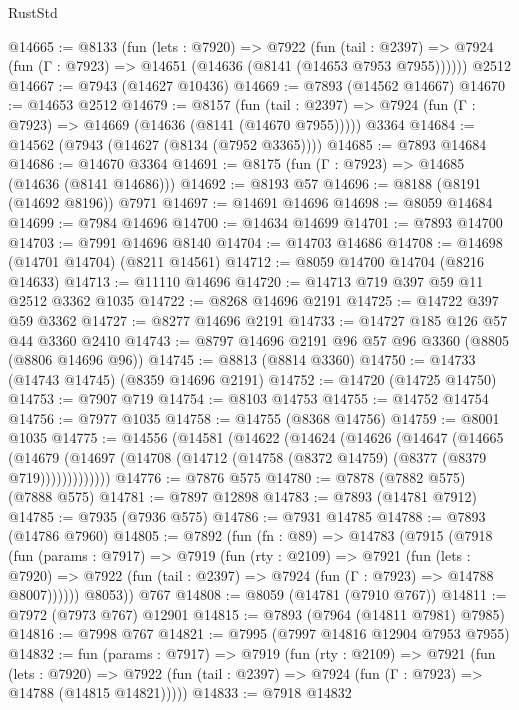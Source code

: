\begin{lexlean}{RustStd}
\begin{coremodule}
@14665 := @8133
    (fun (lets : @7920) =>
    @7922
      (fun (tail : @2397) =>
      @7924 (fun (Γ : @7923) => @14651 (@14636 (@8141 (@14653 @7953 @7955))))))
    @2512
@14667 := @7943 (@14627 @10436)
@14669 := @7893 (@14562 @14667)
@14670 := @14653 @2512
@14679 := @8157
    (fun (tail : @2397) => @7924 (fun (Γ : @7923) => @14669 (@14636 (@8141 (@14670 @7955)))))
    @3364
@14684 := @14562 (@7943 (@14627 (@8134 (@7952 @3365))))
@14685 := @7893 @14684
@14686 := @14670 @3364
@14691 := @8175 (fun (Γ : @7923) => @14685 (@14636 (@8141 @14686)))
@14692 := @8193 @57
@14696 := @8188 (@8191 (@14692 @8196)) @7971
@14697 := @14691 @14696
@14698 := @8059 @14684
@14699 := @7984 @14696
@14700 := @14634 @14699
@14701 := @7893 @14700
@14703 := @7991 @14696 @8140
@14704 := @14703 @14686
@14708 := @14698 (@14701 @14704) (@8211 @14561)
@14712 := @8059 @14700 @14704 (@8216 @14633)
@14713 := @11110 @14696
@14720 := @14713 @719 @397 @59 @11 @2512 @3362 @1035
@14722 := @8268 @14696 @2191
@14725 := @14722 @397 @59 @3362
@14727 := @8277 @14696 @2191
@14733 := @14727 @185 @126 @57 @44 @3360 @2410
@14743 := @8797 @14696 @2191 @96 @57 @96 @3360 (@8805 (@8806 @14696 @96))
@14745 := @8813 (@8814 @3360)
@14750 := @14733 (@14743 @14745) (@8359 @14696 @2191)
@14752 := @14720 (@14725 @14750)
@14753 := @7907 @719
@14754 := @8103 @14753
@14755 := @14752 @14754
@14756 := @7977 @1035
@14758 := @14755 (@8368 @14756)
@14759 := @8001 @1035
@14775 := @14556
    (@14581
      (@14622
        (@14624
          (@14626
            (@14647
              (@14665
                (@14679
                  (@14697 (@14708 (@14712 (@14758 (@8372 @14759) (@8377 (@8379 @719)))))))))))))
@14776 := @7876 @575
@14780 := @7878 (@7882 @575) (@7888 @575)
@14781 := @7897 @12898
@14783 := @7893 (@14781 @7912)
@14785 := @7935 (@7936 @575)
@14786 := @7931 @14785
@14788 := @7893 (@14786 @7960)
@14805 := @7892
    (fun (fn : @89) =>
    @14783
      (@7915
        (@7918
          (fun (params : @7917) =>
          @7919
            (fun (rty : @2109) =>
            @7921
              (fun (lets : @7920) =>
              @7922 (fun (tail : @2397) => @7924 (fun (Γ : @7923) => @14788 @8007))))))
        @8053))
    @767
@14808 := @8059 (@14781 (@7910 @767))
@14811 := @7972 (@7973 @767) @12901
@14815 := @7893 (@7964 (@14811 @7981) @7985)
@14816 := @7998 @767
@14821 := @7995 (@7997 @14816 @12904 @7953 @7955)
@14832 := fun (params : @7917) =>
  @7919
    (fun (rty : @2109) =>
    @7921
      (fun (lets : @7920) =>
      @7922 (fun (tail : @2397) => @7924 (fun (Γ : @7923) => @14788 (@14815 @14821)))))
@14833 := @7918 @14832

\end{coremodule}
\end{lexlean}
